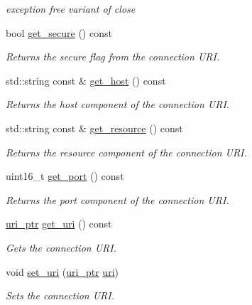 \begin{DoxyCompactItemize}
\begin{DoxyCompactList}\small\item\em exception free variant of close \end{DoxyCompactList}\item 
bool \hyperlink{classwebsocketpp_1_1connection_a65514127120694d4c2a583b79bafe79e}{get\+\_\+secure} () const 
\begin{DoxyCompactList}\small\item\em Returns the secure flag from the connection U\+R\+I. \end{DoxyCompactList}\item 
std\+::string const \& \hyperlink{classwebsocketpp_1_1connection_a924fcd958acdb66e8b04234af73afaf3}{get\+\_\+host} () const 
\begin{DoxyCompactList}\small\item\em Returns the host component of the connection U\+R\+I. \end{DoxyCompactList}\item 
std\+::string const \& \hyperlink{classwebsocketpp_1_1connection_a02f604aa2a3401ff83c845d65ff06e9b}{get\+\_\+resource} () const 
\begin{DoxyCompactList}\small\item\em Returns the resource component of the connection U\+R\+I. \end{DoxyCompactList}\item 
uint16\+\_\+t \hyperlink{classwebsocketpp_1_1connection_a59fb24787c8ad9796ca447b98de3140b}{get\+\_\+port} () const 
\begin{DoxyCompactList}\small\item\em Returns the port component of the connection U\+R\+I. \end{DoxyCompactList}\item 
\hyperlink{namespacewebsocketpp_aae370ea5ac83a8ece7712cb39fc23f5b}{uri\+\_\+ptr} \hyperlink{classwebsocketpp_1_1connection_a424a90ec2f576fe288a712618e59fddd}{get\+\_\+uri} () const 
\begin{DoxyCompactList}\small\item\em Gets the connection U\+R\+I. \end{DoxyCompactList}\item 
void \hyperlink{classwebsocketpp_1_1connection_ac5c81acf3be998662a3500a9be2c4d38}{set\+\_\+uri} (\hyperlink{namespacewebsocketpp_aae370ea5ac83a8ece7712cb39fc23f5b}{uri\+\_\+ptr} \hyperlink{classwebsocketpp_1_1uri}{uri})
\begin{DoxyCompactList}\small\item\em Sets the connection U\+R\+I. \end{DoxyCompactList}\item 

\end{DoxyCompactItemize}
